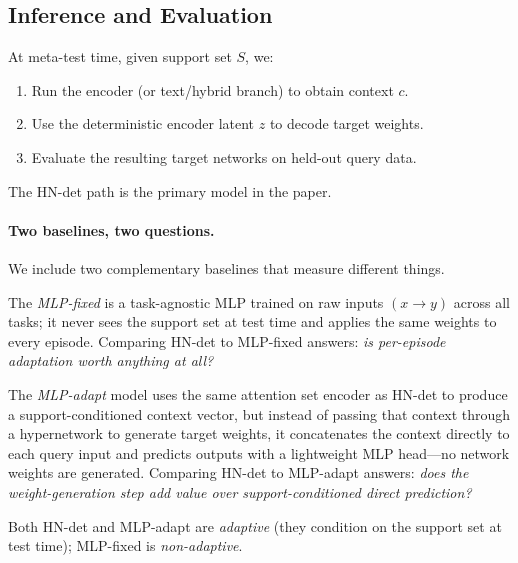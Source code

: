 \subsection{Inference and Evaluation}

At meta-test time, given support set $S$, we:
\begin{enumerate}
  \item Run the encoder (or text/hybrid branch) to obtain context $c$.
  \item Use the deterministic encoder latent $z$ to decode target weights.
  \item Evaluate the resulting target networks on held-out query data.
\end{enumerate}
The HN-det path is the primary model in the paper.

\paragraph{Two baselines, two questions.}
We include two complementary baselines that measure different things.

The \emph{MLP-fixed} is a task-agnostic MLP trained on raw inputs $(x \to y)$ across all tasks; it never sees the support set at test time and applies the same weights to every episode.
Comparing HN-det to MLP-fixed answers: \emph{is per-episode adaptation worth anything at all?}

The \emph{MLP-adapt} model uses the same attention set encoder as HN-det to produce a support-conditioned context vector, but instead of passing that context through a hypernetwork to generate target weights, it concatenates the context directly to each query input and predicts outputs with a lightweight MLP head---no network weights are generated.
Comparing HN-det to MLP-adapt answers: \emph{does the weight-generation step add value over support-conditioned direct prediction?}

Both HN-det and MLP-adapt are \emph{adaptive} (they condition on the support set at test time); MLP-fixed is \emph{non-adaptive}.
